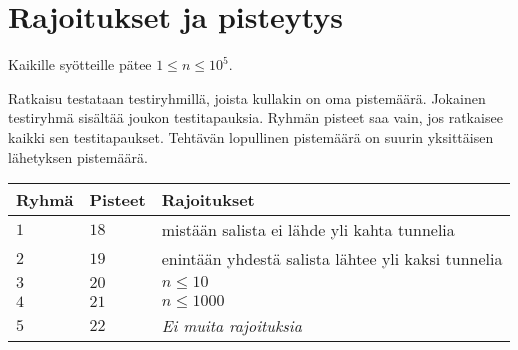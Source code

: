 \section*{Rajoitukset ja pisteytys}

Kaikille syötteille pätee
$1\leq n\leq 10^5$. %

Ratkaisu testataan testiryhmillä, joista kullakin on oma pistemäärä.
Jokainen testiryhmä sisältää joukon testitapauksia.
Ryhmän pisteet saa vain, jos ratkaisee kaikki sen testitapaukset.
Tehtävän lopullinen pistemäärä on suurin yksittäisen lähetyksen pistemäärä.

\medskip
\begin{tabular}{lll}
Ryhmä & Pisteet & Rajoitukset \\\hline
  $1$ & $18$ & mistään salista ei lähde yli kahta tunnelia \\
  $2$ & $19$ & enintään yhdestä salista lähtee yli kaksi tunnelia \\
  $3$ & $20$ & $n\leq 10$\\
  $4$ & $21$ & $n\leq 1000$\\
  $5$ & $22$ & \emph{Ei muita rajoituksia}
\end{tabular}
